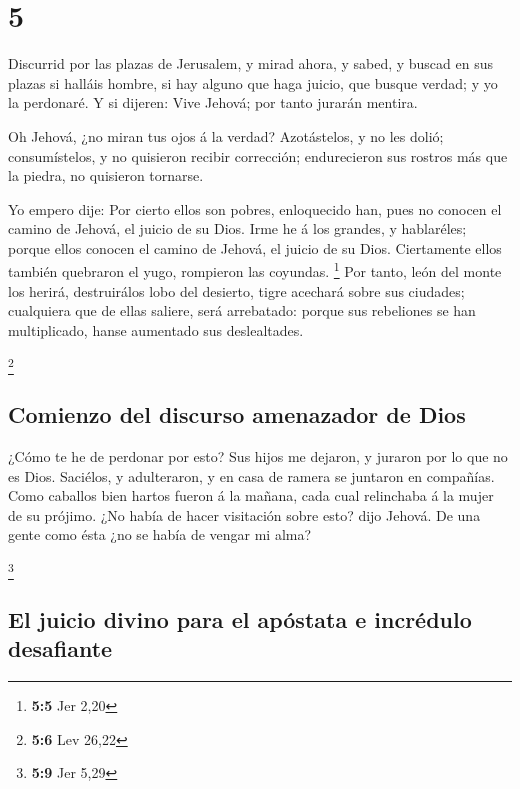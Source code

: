 \hypertarget{section-4}{%
\section{5}\label{section-4}}

 Discurrid por las plazas de Jerusalem, y mirad ahora, y
sabed, y buscad en sus plazas si halláis hombre, si hay alguno que haga
juicio, que busque verdad; y yo la perdonaré.  Y si dijeren:
Vive Jehová; por tanto jurarán mentira.

 Oh Jehová, ¿no miran tus ojos á la verdad? Azotástelos, y
no les dolió; consumístelos, y no quisieron recibir corrección;
endurecieron sus rostros más que la piedra, no quisieron tornarse.

 Yo empero dije: Por cierto ellos son pobres, enloquecido
han, pues no conocen el camino de Jehová, el juicio de su Dios.
 Irme he á los grandes, y hablaréles; porque ellos conocen
el camino de Jehová, el juicio de su Dios. Ciertamente ellos también
quebraron el yugo, rompieron las coyundas. \footnote{\textbf{5:5} Jer
  2,20}  Por tanto, león del monte los herirá, destruirálos
lobo del desierto, tigre acechará sobre sus ciudades; cualquiera que de
ellas saliere, será arrebatado: porque sus rebeliones se han
multiplicado, hanse aumentado sus deslealtades.

\footnote{\textbf{5:6} Lev 26,22}

\hypertarget{comienzo-del-discurso-amenazador-de-dios}{%
\subsection{Comienzo del discurso amenazador de
Dios}\label{comienzo-del-discurso-amenazador-de-dios}}

 ¿Cómo te he de perdonar por esto? Sus hijos me dejaron, y
juraron por lo que no es Dios. Saciélos, y adulteraron, y en casa de
ramera se juntaron en compañías.  Como caballos bien hartos
fueron á la mañana, cada cual relinchaba á la mujer de su prójimo.
 ¿No había de hacer visitación sobre esto? dijo Jehová. De
una gente como ésta ¿no se había de vengar mi alma?

\footnote{\textbf{5:9} Jer 5,29}

\hypertarget{el-juicio-divino-para-el-apuxf3stata-e-incruxe9dulo-desafiante}{%
\subsection{El juicio divino para el apóstata e incrédulo
desafiante}\label{el-juicio-divino-para-el-apuxf3stata-e-incruxe9dulo-desafiante}}

